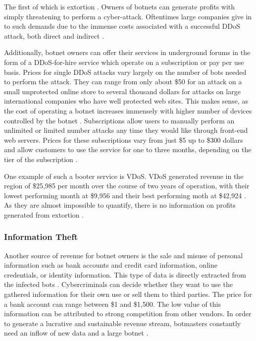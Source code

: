 The first of which is extortion \cite{Bailey09}. Owners of botnets can generate profits with simply threatening to perform a cyber-attack. Oftentimes large companies give in to such demands due to the immense costs associated with a successful DDoS attack, both direct and indirect \cite{Namestnikov09}.

Additionally, botnet owners can offer their services in underground forums in the form of a DDoS-for-hire service which operate on a subscription or pay per use basis. Prices for single DDoS attacks vary largely on the number of bots needed to perform the attack. They can range from only about \$50 for an attack on a small unprotected online store to several thousand dollars for attacks on large international companies who have well protected web sites. This makes sense, as the cost of operating a botnet increases immensely with higher number of devices controlled by the botnet \cite{Namestnikov09}. Subscriptions allow users to manually perform an unlimited or limited number attacks any time they would like through front-end web servers. Prices for these subscriptions vary from just \$5 up to \$300 dollars and allow customers to use the service for one to three months, depending on the tier of the subscription \cite{Bailey09}.

One example of such a booter service is VDoS. VDoS generated revenue in the region of \$25,985 per month over the course of two years of operation, with their lowest performing month at \$9,956 and their best performing moth at \$42,924 \cite{Bailey09}. As they are almost impossible to quantify, there is no information on profits generated from extortion \cite{Namestnikov09}.

		\subsubsection{Information Theft}
		Another source of revenue for botnet owners is the sale and misuse of personal information such as bank accounts and credit card information, online credentials, or identity information. This type of data is directly extracted from the infected bots \cite{Bottazzi14}. Cybercriminals can decide whether they want to use the gathered information for their own use or sell them to third parties. The price for a bank account can range between \$1 and \$1,500. The low value of this information can be attributed to strong competition from other vendors. In order to generate a lucrative and sustainable revenue stream, botmasters constantly need an inflow of new data and a large botnet \cite{Namestnikov09}.


